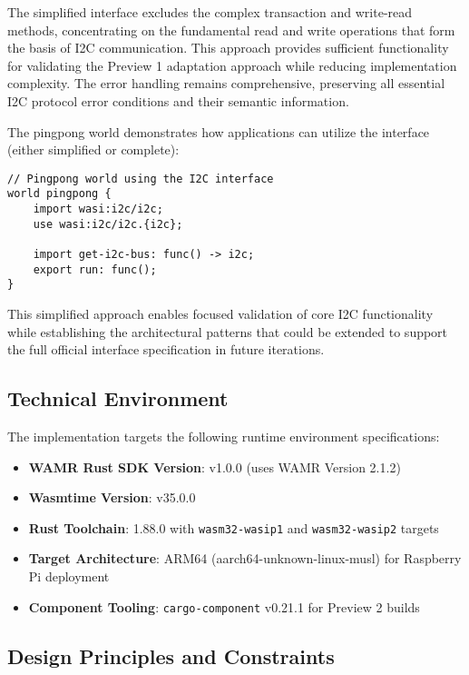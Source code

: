 The simplified interface excludes the complex transaction and write-read methods, concentrating on the fundamental read and write operations that form the basis of I2C communication. This approach provides sufficient functionality for validating the Preview 1 adaptation approach while reducing implementation complexity. The error handling remains comprehensive, preserving all essential I2C protocol error conditions and their semantic information.

The pingpong world demonstrates how applications can utilize the interface (either simplified or complete):

\begin{verbatim}
// Pingpong world using the I2C interface
world pingpong {
    import wasi:i2c/i2c;
    use wasi:i2c/i2c.{i2c};

    import get-i2c-bus: func() -> i2c;
    export run: func();
}
\end{verbatim}

This simplified approach enables focused validation of core I2C functionality while establishing the architectural patterns that could be extended to support the full official interface specification in future iterations.

\subsection{Technical Environment}

The implementation targets the following runtime environment specifications:

\begin{itemize}
    \item \textbf{WAMR Rust SDK Version}: v1.0.0 (uses WAMR Version 2.1.2)
    \item \textbf{Wasmtime Version}: v35.0.0
    \item \textbf{Rust Toolchain}: 1.88.0 with \texttt{wasm32-wasip1} and \texttt{wasm32-wasip2} targets
    \item \textbf{Target Architecture}: ARM64 (aarch64-unknown-linux-musl) for Raspberry Pi deployment
    \item \textbf{Component Tooling}: \texttt{cargo-component} v0.21.1 for Preview 2 builds
\end{itemize}

\subsection{Design Principles and Constraints}

